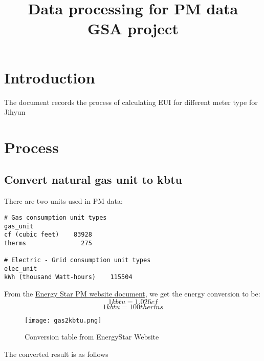 \documentclass[12pt]{article}
\begin{document}
\title{Data processing for PM data\\
       \large GSA project}
\maketitle
\tableofcontents
\newpage
\section{Introduction}\label{sec:intro}
The document records the process of calculating EUI for different
meter type for Jihyun

\section{Process}
\subsection{Convert natural gas unit to kbtu}
There are two units used in PM data:
\makeatletter
\def\verbatim@font{\linespread{1}\small\ttfamily}
\begin{verbatim}
# Gas consumption unit types
gas_unit
cf (cubic feet)    83928
therms               275

# Electric - Grid consumption unit types
elec_unit
kWh (thousand Watt-hours)    115504
\end{verbatim}
From the
\href{https://portfoliomanager.energystar.gov/pdf/reference/Thermal%20Conversions.pdf}{Energy Star PM website document}, we get the energy conversion to be:
$$1 kbtu = 1.026 cf$$
$$1 kbtu = 100 therms $$
\begin{figure}[h!]
  \centering
  \texttt{[image: gas2kbtu.png]}
  \caption{Conversion table from EnergyStar Website}
  \label{fig:gas2kbtu}
\end{figure}
The converted result is as follows
\end{document}
